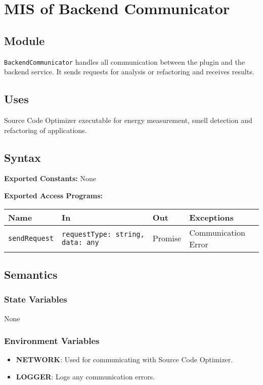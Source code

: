 \documentclass[12pt, titlepage]{article}
\begin{document}
\section{MIS of Backend Communicator}

\subsection{Module}
\texttt{BackendCommunicator} handles all communication between the plugin and the backend service. It sends requests for analysis or refactoring and receives results.

\subsection{Uses}
Source Code Optimizer executable for energy measurement, smell detection and refactoring of applications.

\subsection{Syntax}

\textbf{Exported Constants:} None

\noindent \textbf{Exported Access Programs:}\\
\begin{tabularx}{\linewidth}{|l|>{\raggedright\arraybackslash}X|l|l|}
  \hline
  \textbf{Name} & \textbf{In} & \textbf{Out} & \textbf{Exceptions} \\
  \hline
  \texttt{sendRequest} & \texttt{requestType: string, data: any} & Promise & Communication Error \\
  \hline
\end{tabularx}


\subsection{Semantics}

\subsubsection{State Variables}
None

\subsubsection{Environment Variables}
\begin{itemize}
\item \textbf{NETWORK}: Used for communicating with Source Code Optimizer.
\item \textbf{LOGGER}: Logs any communication errors.
\end{itemize}
\end{document}

